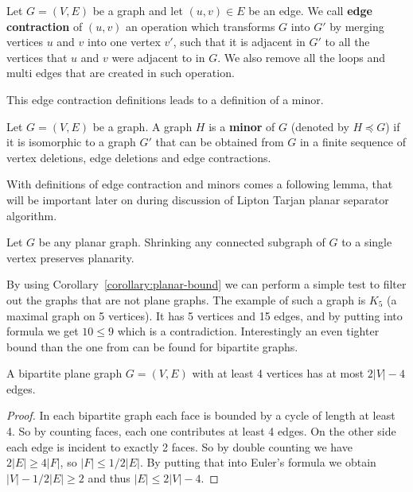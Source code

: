 \begin{defn}
\label{defn:contraction}
Let $G = (V, E)$ be a graph and let $(u,v) \in E$ be an edge. We call \textbf{edge contraction} of $(u, v)$ an operation which transforms 
    $G$ into $G'$ by merging vertices $u$ and $v$ into one vertex $v'$, such that it is adjacent in $G'$ to all the vertices that $u$ and $v$
    were adjacent to in $G$. We also remove all the loops and multi edges that are created in such operation.
\end{defn}

This edge contraction definitions leads to a definition of a minor.

\begin{defn}
\label{defn:minor}
Let $G = (V, E)$ be a graph. A graph $H$ is a \textbf{minor} of $G$ (denoted by $H \preccurlyeq G$) if it is isomorphic to a graph $G'$ that 
    can be obtained from $G$ in a finite sequence of vertex deletions, edge deletions and edge contractions.
\end{defn}

With definitions of edge contraction and minors comes a following lemma, that will be 
important later on during discussion of Lipton Tarjan planar separator algorithm.

\begin{lemma}   \label{lem:shrinking}
    Let $G$ be any planar graph. Shrinking any connected subgraph of $G$ to a
    single vertex preserves planarity.
\end{lemma}

By using Corollary~\ref{corollary:planar-bound} we can perform a simple test to filter out the graphs that are not plane graphs. The example of
such a graph is $K_5$ (a maximal graph on 5 vertices). It has 5 vertices and 15 edges, and by putting into formula we get $10 \leq 9$ which 
is a contradiction. Interestingly an even tighter bound than the one from  can be found for bipartite graphs.

\begin{corollary} \label{corollary:bipartite-bound}
    A bipartite plane graph $G = (V, E)$ with at least 4 vertices has at most $2 |V| - 4$ edges.
\end{corollary}
\begin{proof}
    In each bipartite graph each face is bounded by a cycle of length at least 4. So by counting faces, each one contributes at least 4 edges.
    On the other side each edge is incident to exactly 2 faces. So by double counting we have $2|E| \geq 4|F|$, so $|F| \leq 1/2 |E|$.
    By putting that into Euler's formula we obtain $|V| - 1/2|E| \geq 2$ and thus $|E| \leq 2|V| - 4$.
\end{proof}

